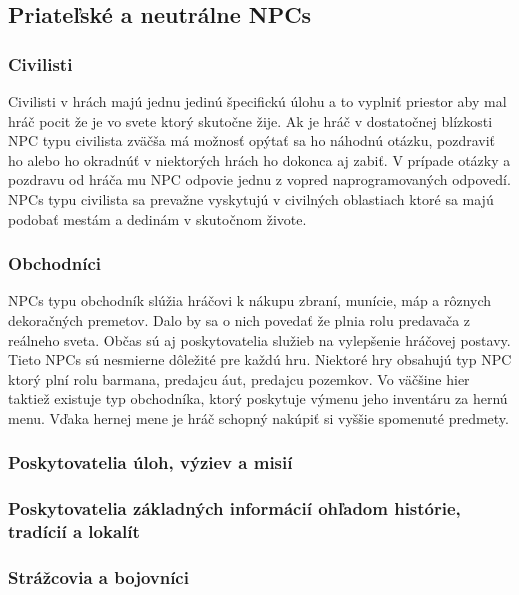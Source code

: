 \documentclass[10pt,twoside,slovak,a4paper]{article}
\begin{document}
\subsection{Priateľské a neutrálne NPCs}  \label{Ally & non}  

\subsubsection{Civilisti} 
Civilisti v hrách majú jednu jedinú špecifickú úlohu a to vyplniť priestor aby mal hráč pocit že je vo svete ktorý skutočne žije. Ak je hráč v dostatočnej blízkosti NPC typu civilista zväčša má možnosť opýtať sa ho náhodnú otázku, pozdraviť ho alebo ho okradnúť v niektorých hrách ho dokonca aj zabiť. V prípade otázky a pozdravu od hráča mu NPC odpovie jednu z vopred naprogramovaných odpovedí. NPCs typu civilista sa prevažne vyskytujú v civilných oblastiach ktoré sa majú podobať mestám a dedinám v skutočnom živote.  


\subsubsection{Obchodníci}
NPCs typu obchodník slúžia hráčovi k nákupu zbraní, munície, máp a rôznych dekoračných premetov. Dalo by sa o nich povedať že plnia rolu predavača z reálneho sveta. Občas sú aj poskytovatelia služieb na vylepšenie hráčovej postavy. Tieto NPCs sú nesmierne dôležité pre každú hru. Niektoré hry obsahujú typ NPC ktorý plní rolu barmana, predajcu áut, predajcu pozemkov. Vo väčšine hier taktiež existuje typ obchodníka, ktorý poskytuje výmenu jeho inventáru za hernú menu. Vďaka hernej mene je hráč schopný nakúpiť si vyššie spomenuté predmety.  


\subsubsection{Poskytovatelia úloh, výziev a misií}
\subsubsection{Poskytovatelia základných informácií ohľadom histórie, tradícií a lokalít}


\subsubsection{Strážcovia a bojovníci} \label{services}
\end{document}
